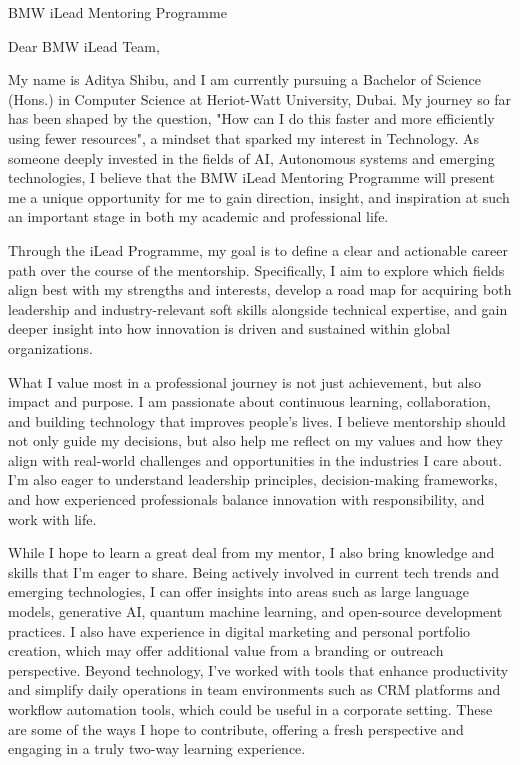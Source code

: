 \documentclass{letter}
\begin{document}
\begin{letter}{BMW iLead Mentoring Programme}

\opening{Dear BMW iLead Team,}

My name is Aditya Shibu, and I am currently pursuing a Bachelor of Science (Hons.) in Computer Science at Heriot-Watt University, Dubai. My journey so far has been shaped by the question, "How can I do this faster and more efficiently using fewer resources", a mindset that sparked my interest in Technology. As someone deeply invested in the fields of AI, Autonomous systems and emerging technologies, I believe that the BMW iLead Mentoring Programme will present me a unique opportunity for me to gain direction, insight, and inspiration at such an important stage in both my academic and professional life.

Through the iLead Programme, my goal is to define a clear and actionable career path over the course of the mentorship. Specifically, I aim to explore which fields align best with my strengths and interests, develop a road map for acquiring both leadership and industry-relevant soft skills alongside technical expertise, and gain deeper insight into how innovation is driven and sustained within global organizations.

What I value most in a professional journey is not just achievement, but also impact and purpose. I am passionate about continuous learning, collaboration, and building technology that improves people’s lives. I believe mentorship should not only guide my decisions, but also help me reflect on my values and how they align with real-world challenges and opportunities in the industries I care about. I’m also eager to understand leadership principles, decision-making frameworks, and how experienced professionals balance innovation with responsibility, and work with life.

While I hope to learn a great deal from my mentor, I also bring knowledge and skills that I’m eager to share. Being actively involved in current tech trends and emerging technologies, I can offer insights into areas such as large language models, generative AI, quantum machine learning, and open-source development practices. I also have experience in digital marketing and personal portfolio creation, which may offer additional value from a branding or outreach perspective. Beyond technology, I’ve worked with tools that enhance productivity and simplify daily operations in team environments such as CRM platforms and workflow automation tools, which could be useful in a corporate setting. These are some of the ways I hope to contribute, offering a fresh perspective and engaging in a truly two-way learning experience.


\end{letter}
\end{document}
